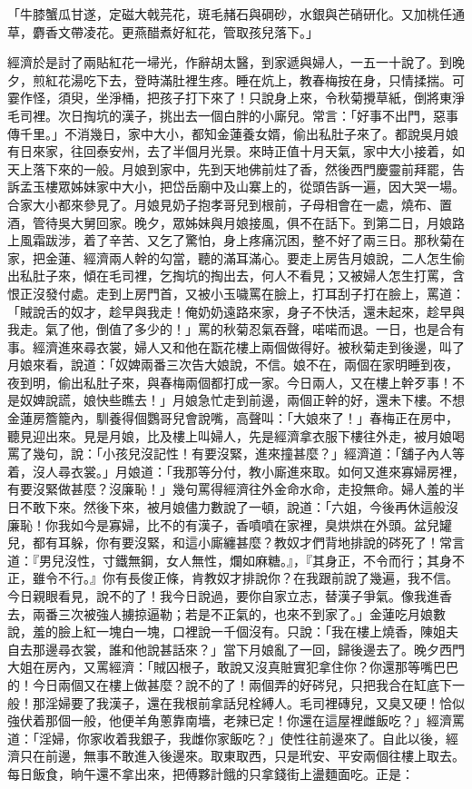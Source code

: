 「牛膝蟹瓜甘遂，定磁大戟芫花，斑毛赭石與碙砂，水銀與芒硝研化。又加桃任通草，麝香文帶凌花。更燕醋煮好紅花，管取孩兒落下。」

經濟於是討了兩貼紅花一埽光，作辭胡太醫，到家遞與婦人，一五一十說了。到晚夕，煎紅花湯吃下去，登時滿肚裡生疼。睡在炕上，教春梅按在身，只情揉揣。可霎作怪，須臾，坐淨桶，把孩子打下來了！只說身上來，令秋菊攪草紙，倒將東淨毛司裡。次日掏坑的漢子，挑出去一個白胖的小廝兒。常言：「好事不出門，惡事傳千里。」不消幾日，家中大小，都知金蓮養女婿，偷出私肚子來了。都說吳月娘有日來家，往回泰安州，去了半個月光景。來時正值十月天氣，家中大小接着，如天上落下來的一般。月娘到家中，先到天地佛前炷了香，然後西門慶靈前拜罷，告訴孟玉樓眾姊妹家中大小，把岱岳廟中及山寨上的，從頭告訴一遍，因大哭一場。合家大小都來參見了。月娘見奶子抱孝哥兒到根前，子母相會在一處，燒布、置酒，管待吳大舅回家。晚夕，眾姊妹與月娘接風，俱不在話下。到第二日，月娘路上風霜跋涉，着了辛苦、又乞了驚怕，身上疼痛沉困，整不好了兩三日。那秋菊在家，把金蓮、經濟兩人幹的勾當，聽的滿耳滿心。要走上房告月娘說，二人怎生偷出私肚子來，傾在毛司裡，乞掏坑的掏出去，何人不看見；又被婦人怎生打罵，含恨正沒發付處。走到上房門首，又被小玉噦罵在臉上，打耳刮子打在臉上，罵道：「賊說舌的奴才，趁早與我走！俺奶奶遠路來家，身子不快活，還未起來，趁早與我走。氣了他，倒值了多少的！」罵的秋菊忍氣吞聲，喏喏而退。一日，也是合有事。經濟進來尋衣裳，婦人又和他在翫花樓上兩個做得好。被秋菊走到後邊，叫了月娘來看，說道：「奴婢兩番三次告大娘說，不信。娘不在，兩個在家明睡到夜，夜到明，偷出私肚子來，與春梅兩個都打成一家。今日兩人，又在樓上幹歹事！不是奴婢說謊，娘快些瞧去！」月娘急忙走到前邊，兩個正幹的好，還未下樓。不想金蓮房簷籠內，馴養得個鸚哥兒會說嘴，高聲叫：「大娘來了！」春梅正在房中，聽見迎出來。見是月娘，比及樓上叫婦人，先是經濟拿衣服下樓往外走，被月娘喝罵了幾句，說：「小孩兒沒記性！有要沒緊，進來撞甚麼？」經濟道：「舖子內人等着，沒人尋衣裳。」月娘道：「我那等分付，教小廝進來取。如何又進來寡婦房裡，有要沒緊做甚麼？沒廉恥！」幾句罵得經濟往外金命水命，走投無命。婦人羞的半日不敢下來。然後下來，被月娘儘力數說了一頓，說道：「六姐，今後再休這般沒廉恥！你我如今是寡婦，比不的有漢子，香噴噴在家裡，臭烘烘在外頭。盆兒罐兒，都有耳躲，你有要沒緊，和這小廝纏甚麼？教奴才們背地排說的硶死了！常言道：『男兒沒性，寸鐵無鋼，女人無性，爛如麻糖。』，『其身正，不令而行；其身不正，雖令不行。』你有長俊正條，肯教奴才排說你？在我跟前說了幾遍，我不信。今日親眼看見，說不的了！我今日說過，要你自家立志，替漢子爭氣。像我進香去，兩番三次被強人擄掠逼勒；若是不正氣的，也來不到家了。」金蓮吃月娘數說，羞的臉上紅一塊白一塊，口裡說一千個沒有。只說：「我在樓上燒香，陳姐夫自去那邊尋衣裳，誰和他說甚話來？」當下月娘亂了一回，歸後邊去了。晚夕西門大姐在房內，又罵經濟：「賊囚根子，敢說又沒真賍實犯拿住你？你還那等嘴巴巴的！今日兩個又在樓上做甚麼？說不的了！兩個弄的好硶兒，只把我合在缸底下一般！那淫婦要了我漢子，還在我根前拿話兒栓縛人。毛司裡磚兒，又臭又硬！恰似強伏着那個一般，他便羊角蔥靠南墻，老辣已定！你還在這屋裡雌飯吃？」經濟罵道：「淫婦，你家收着我銀子，我雌你家飯吃？」使性往前邊來了。自此以後，經濟只在前邊，無事不敢進入後邊來。取東取西，只是玳安、平安兩個往樓上取去。每日飯食，晌午還不拿出來，把傅夥計餓的只拿錢街上盪麵面吃。正是：

